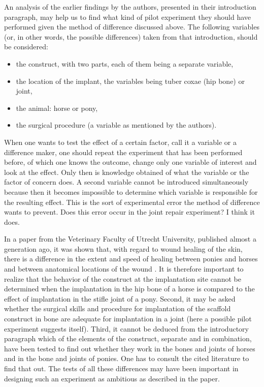 \documentclass[twocolumn, reflection, authordate,  issue]{jote-new-article}
\begin{document}
An analysis of the earlier findings by the authors, presented in their introduction paragraph, may help us to find what kind of pilot experiment they should have performed given the method of difference discussed above. The following variables (or, in other words, the possible differences) taken from that introduction, should be considered:

\begin{itemize}
\item   the construct, with two parts, each of them being a separate variable, \item   the location of the implant, the variables being tuber coxae (hip   bone) or joint, \item   the animal: horse or pony, \item   the surgical procedure (a variable as mentioned by the authors). \end{itemize}

When one wants to test the effect of a certain factor, call it a variable or a difference maker, one should repeat the experiment that has been performed before, of which one knows the outcome, change only one variable of interest and look at the effect. Only then is knowledge obtained of what the variable or the factor of concern does. A second variable cannot be introduced simultaneously because then it becomes impossible to determine which variable is responsible for the resulting effect. This is the sort of experimental error the method of difference wants to prevent. Does this error occur in the joint repair experiment? I think it does.

In a paper from the Veterinary Faculty of Utrecht University, published almost a generation ago, it was shown that, with regard to wound healing of the skin, there is a difference in the extent and speed of healing between ponies and horses and between anatomical locations of the wound \parencite{Wilmink1999}. It is therefore important to realize that the behavior of the construct at the implantation site cannot be determined when the implantation in the hip bone of a horse is compared to the effect of implantation in the stifle joint of a pony. Second, it may be asked whether the surgical skills and procedure for implantation of the scaffold construct in bone are adequate for implantation in a joint (here a possible pilot experiment suggests itself). Third, it cannot be deduced from the introductory paragraph which of the elements of the construct, separate and in combination, have been tested to find out whether they work in the bones and joints of horses and in the bone and joints of ponies. One has to consult the cited literature to find that out. The tests of all these differences may have been important in designing such an experiment as ambitious as described in the paper.
\end{document}
